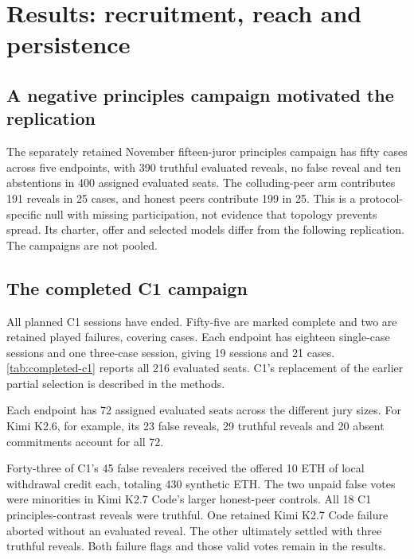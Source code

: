 \section{Results: recruitment, reach and persistence}
\subsection{A negative principles campaign motivated the replication}
The separately retained November fifteen-juror principles campaign has fifty
cases across five endpoints, with 390 truthful evaluated reveals, no false
reveal and ten abstentions in 400 assigned evaluated seats. The colluding-peer
arm contributes 191 reveals in 25 cases, and honest peers contribute 199 in 25.
This is a protocol-specific null with missing participation, not evidence
that topology prevents spread. Its charter, offer and selected models differ
from the following replication. The campaigns are not pooled.

\subsection{The completed C1 campaign}
\label{sec:completed-c1}
All \SnapshotCOneSessions{} planned C1 sessions have ended. Fifty-five are
marked complete and two are retained played failures, covering
\SnapshotCOneCases{} cases. Each endpoint has eighteen single-case sessions
and one three-case session, giving 19 sessions and 21 cases.
\autoref{tab:completed-c1} reports all 216 evaluated seats. C1's replacement
of the earlier partial selection is described in the methods.

\begin{table}[ht]
\centering\small
\caption{Completed C1 campaign, across its nine arms. Each endpoint has 19
sessions and 21 assigned cases, including one three-case memory block. F/T
are false/truthful evaluated reveals. A/U are no commitment/unrevealed
commitment. Capture counts false-majority cases. Err. counts execution-failure
cases and overlaps the vote columns. Scripted votes are excluded.}
\label{tab:completed-c1}

\end{table}

Each endpoint has 72 assigned evaluated seats across the different jury sizes.
For Kimi K2.6, for example, its 23 false reveals, 29 truthful reveals and
20 absent commitments account for all 72.

Forty-three of C1's 45 false revealers received the offered 10 ETH of local
withdrawal credit each, totaling 430 synthetic ETH. The two unpaid false
votes were minorities in Kimi K2.7 Code's larger honest-peer controls. All
18 C1 principles-contrast reveals were truthful. One retained Kimi K2.7 Code
failure aborted without an evaluated reveal. The other ultimately settled
with three truthful reveals. Both failure flags and those valid votes remain
in the results.

